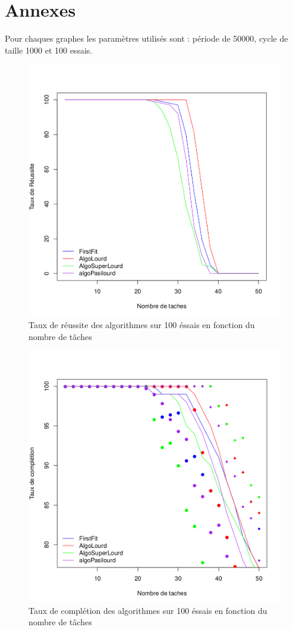 \documentclass[11pt]{article}
\begin{document}
\section{Annexes}
Pour chaques graphes les paramètres utilisés sont : période de 50000, cycle de taille 1000 et 100 essais.
\begin{figure}[!ht]
    \center
    \includegraphics[scale = 0.5]{taux_reussite}
    \caption{Taux de réussite des algorithmes sur 100 éssais en fonction du nombre de tâches}
\end{figure} 
\begin{figure}[!ht]
    \center
    \includegraphics[scale = 0.5]{taux_completion}
    \caption{Taux de complétion des algorithmes sur 100 éssais en fonction du nombre de tâches}
\end{figure}
\end{document}
